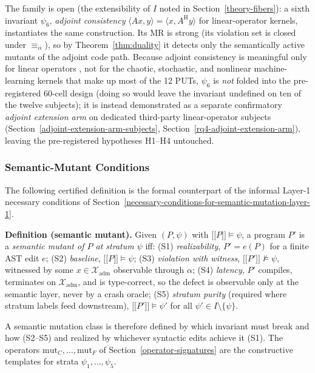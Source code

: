 \documentclass[manuscript,screen,review]{acmart}
\begin{document}
The family is open (the extensibility of $I$ noted in Section~\ref{theory-fibers}): a sixth
invariant $\psi_6$, \emph{adjoint consistency}
$\langle A x, y\rangle = \langle x, A^{\mathrm{H}} y\rangle$ for
linear-operator kernels, instantiates the same construction. Its MR is
strong (its violation set is closed under $\equiv_\alpha$), so by
Theorem~\ref{thm:duality} it detects only the semantically active mutants of the adjoint code
path. Because adjoint consistency is meaningful only for linear operators
, not for the chaotic, stochastic, and nonlinear machine-learning
kernels that make up most of the 12 PUTs, $\psi_6$ is \emph{not} folded
into the pre-registered 60-cell design (doing so would leave the invariant
undefined on ten of the twelve subjects); it is instead demonstrated as a
separate confirmatory \emph{adjoint extension arm} on dedicated
third-party linear-operator subjects (Section~\ref{adjoint-extension-arm-subjects}, Section~\ref{rq4-adjoint-extension-arm}), leaving the
pre-registered hypotheses H1--H4 untouched.

\subsubsection{Semantic-Mutant Conditions}\label{theory-s1s5}

The following certified definition is the formal counterpart of the
informal Layer-1 necessary conditions of Section~\ref{necessary-conditions-for-semantic-mutation-layer-1}.

\textbf{Definition (semantic mutant).} Given $(P, \psi)$ with
$\mathopen{\lbrack\!\lbrack} P \mathclose{\rbrack\!\rbrack} \models \psi$, a program $P'$ is a
\emph{semantic mutant of $P$ at stratum $\psi$} iff: (S1)
\emph{realizability}, $P' = e(P)$ for a finite AST edit $e$; (S2)
\emph{baseline}, $\mathopen{\lbrack\!\lbrack} P \mathclose{\rbrack\!\rbrack} \models \psi$; (S3)
\emph{violation with witness},
$\mathopen{\lbrack\!\lbrack} P' \mathclose{\rbrack\!\rbrack} \not\models \psi$, witnessed by some
$x \in \mathcal{X}_{\mathrm{adm}}$ observable through $\alpha$; (S4)
\emph{latency}, $P'$ compiles, terminates on $\mathcal{X}_{\mathrm{adm}}$,
and is type-correct, so the defect is observable only at the semantic
layer, never by a crash oracle; (S5) \emph{stratum purity} (required
where stratum labels feed downstream),
$\mathopen{\lbrack\!\lbrack} P' \mathclose{\rbrack\!\rbrack} \models \psi'$ for all
$\psi' \in I \setminus \{\psi\}$.

A semantic mutation class is therefore defined by which invariant must
break and how (S2--S5) and realized by whichever syntactic edits achieve
it (S1). The operators $\mathrm{mut}_C, \dots, \mathrm{mut}_F$ of Section~\ref{operator-signatures}
are the constructive templates for strata $\psi_1, \dots, \psi_5$.
\end{document}
